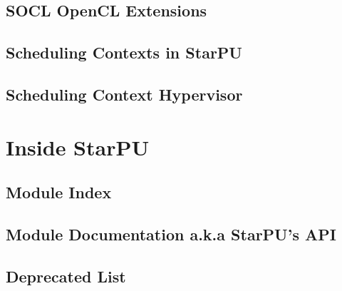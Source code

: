 \documentclass{book}
\begin{document}
\chapter{SOCL OpenCL Extensions}
\label{soclOpenclExtensions}
\hypertarget{soclOpenclExtensions}{}


\chapter{Scheduling Contexts in StarPU}
\label{schedulingContexts}
\hypertarget{schedulingContexts}{}


\chapter{Scheduling Context Hypervisor}
\label{schedulingContextHypervisor}
\hypertarget{schedulingContextHypervisor}{}


\part{Inside StarPU}

\chapter{Module Index}


\chapter{Module Documentation a.k.a StarPU's API}



















%
%
















\chapter{Deprecated List}
\label{deprecated}
\hypertarget{deprecated}{}



\printindex
\end{document}
